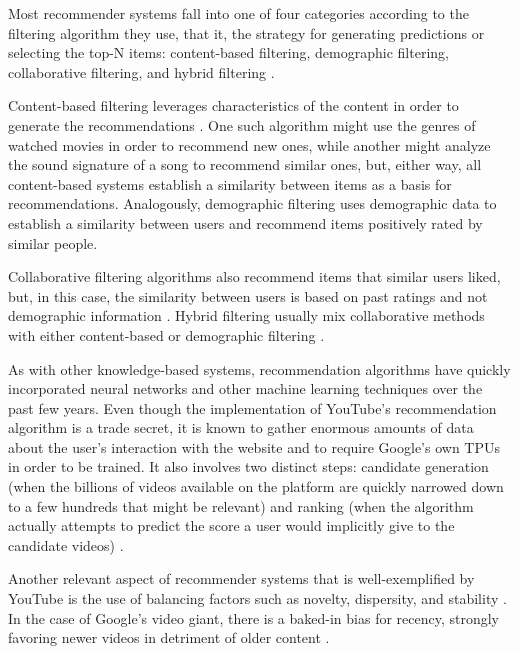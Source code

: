 Most recommender systems fall into one of four categories according to the
filtering algorithm they use, that it, the strategy for generating predictions
or selecting the top-N items: content-based filtering, demographic filtering,
collaborative filtering, and hybrid filtering
\citep{bobadilla_recommender_2013}.

Content-based filtering leverages characteristics of the content in order to
generate the recommendations \citep{ricci_introduction_2011}. One such algorithm
might use the genres of watched movies in order to recommend new ones, while
another might analyze the sound signature of a song to recommend similar ones,
but, either way, all content-based systems establish a similarity between items
as a basis for recommendations. Analogously, demographic filtering uses
demographic data to establish a similarity between users and recommend items
positively rated by similar people.

Collaborative filtering algorithms also recommend items that similar users
liked, but, in this case, the similarity between users is based on past ratings
and not demographic information \citep{ricci_introduction_2011}. Hybrid
filtering usually mix collaborative methods with either content-based or
demographic filtering \citep{ricci_introduction_2011}.

As with other knowledge-based systems, recommendation algorithms have quickly
incorporated neural networks and other machine learning techniques over the past
few years. Even though the implementation of YouTube's recommendation algorithm
is a trade secret, it is known to gather enormous amounts of data about the
user's interaction with the website and to require Google's own TPUs in order to
be trained. It also involves two distinct steps: candidate generation (when the
billions of videos available on the platform are quickly narrowed down to a few
hundreds that might be relevant) and ranking (when the algorithm actually
attempts to predict the score a user would implicitly give to the candidate
videos) \citep{}. %

Another relevant aspect of recommender systems that is well-exemplified by
YouTube is the use of balancing factors such as novelty, dispersity, and
stability \citep{zhao_recommending_2019}. In the case of Google's video giant,
there is a baked-in bias for recency, strongly favoring newer videos in
detriment of older content \citep{zhao_recommending_2019}.

